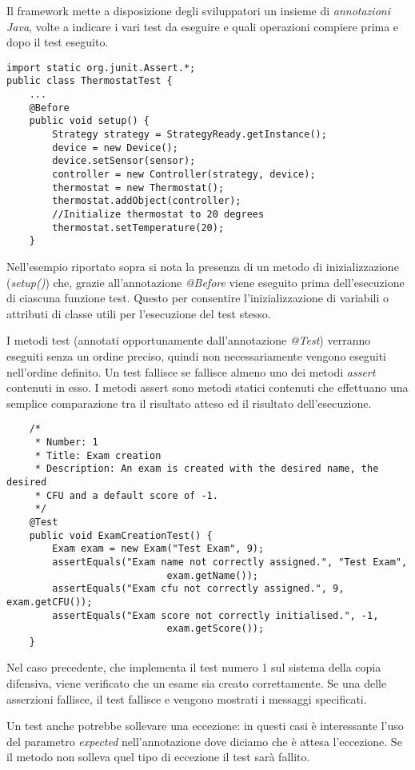 Il framework mette a disposizione degli sviluppatori un insieme di \emph{annotazioni Java}, volte a indicare i vari test da eseguire e quali operazioni compiere prima e dopo il test eseguito.

\begin{lstlisting}
import static org.junit.Assert.*;
public class ThermostatTest {
	...		
	@Before
	public void setup() {
		Strategy strategy = StrategyReady.getInstance();
		device = new Device();
		device.setSensor(sensor);
		controller = new Controller(strategy, device);	
		thermostat = new Thermostat();
		thermostat.addObject(controller);
		//Initialize thermostat to 20 degrees
		thermostat.setTemperature(20);
	}
\end{lstlisting}

Nell'esempio riportato sopra si nota la presenza di un metodo di inizializzazione (\emph{setup()}) che, grazie all'annotazione \emph{@Before} viene eseguito prima dell'esecuzione di ciascuna funzione test. Questo per consentire l'inizializzazione di variabili o attributi di classe utili per l'esecuzione del test stesso.

I metodi test (annotati opportunamente dall'annotazione \emph{@Test}) verranno eseguiti senza un ordine preciso, quindi non necessariamente vengono eseguiti nell'ordine definito. Un test fallisce se fallisce almeno uno dei metodi \emph{assert} contenuti in esso. I metodi assert sono metodi statici contenuti che effettuano una semplice comparazione tra il risultato atteso ed il risultato dell'esecuzione. 

\begin{lstlisting}
	/*
	 * Number: 1
	 * Title: Exam creation
	 * Description: An exam is created with the desired name, the desired 
	 * CFU and a default score of -1.
	 */
	@Test
	public void ExamCreationTest() {
		Exam exam = new Exam("Test Exam", 9);
		assertEquals("Exam name not correctly assigned.", "Test Exam", 
							exam.getName());
		assertEquals("Exam cfu not correctly assigned.", 9, exam.getCFU());
		assertEquals("Exam score not correctly initialised.", -1, 
							exam.getScore());	
	}
\end{lstlisting}

Nel caso precedente, che implementa il test numero 1 sul sistema della copia difensiva, viene verificato che un esame sia creato correttamente. Se una delle asserzioni fallisce, il test fallisce e vengono mostrati i messaggi specificati.

Un test anche potrebbe sollevare una eccezione: in questi casi è interessante l'uso del parametro \emph{expected} nell'annotazione dove diciamo che è attesa l'eccezione. Se il metodo non solleva quel tipo di eccezione il test sarà fallito.

